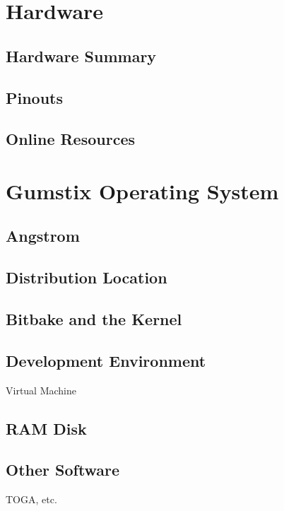 \section{Hardware}

\subsection{Hardware Summary}

\subsection{Pinouts}

\subsection{Online Resources}

\section{Gumstix Operating System}

\subsection{Angstrom}

\subsection{Distribution Location}

\subsection{Bitbake and the Kernel}

\subsection{Development Environment}

Virtual Machine

\subsection{RAM Disk}

\subsection{Other Software}

TOGA, etc.

